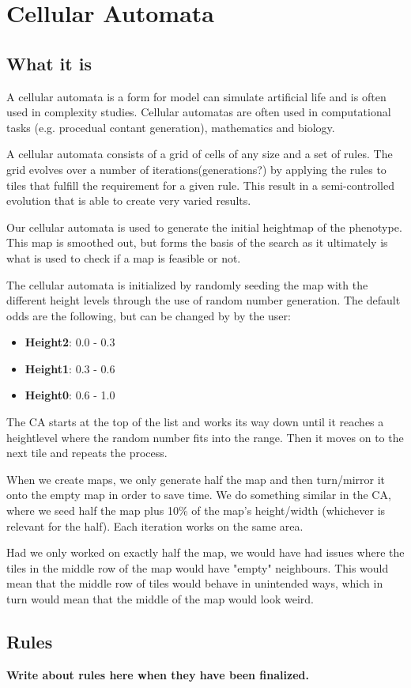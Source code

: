 \section{Cellular Automata}
\label{CellularAutomata}

\subsection{What it is}


A cellular automata is a form for model can simulate artificial life and is often used in complexity studies. Cellular automatas are often used in computational tasks (e.g. procedual contant generation), mathematics and biology.

A cellular automata consists of a grid of cells of any size and a set of rules. The grid evolves over a number of iterations(generations?) by applying the rules to tiles that fulfill the requirement for a given rule. This result in a semi-controlled evolution that is able to create very varied results.

Our cellular automata is used to generate the initial heightmap of the phenotype. This map is smoothed out, but forms the basis of the search as it ultimately is what is used to check if a map is feasible or not.

The cellular automata is initialized by randomly seeding the map with the different height levels through the use of random number generation. The default odds are the following, but can be changed by by the user:
\begin{itemize}

	\item \textbf{Height2}: 0.0 - 0.3

	\item \textbf{Height1}: 0.3 - 0.6

	\item \textbf{Height0}: 0.6 - 1.0

\end{itemize}

The CA starts at the top of the list and works its way down until it reaches a heightlevel where the random number fits into the range. Then it moves on to the next tile and repeats the process.

When we create maps, we only generate half the map and then turn/mirror it onto the empty map in order to save time. We do something similar in the CA, where we seed half the map plus 10\% of the map's height/width (whichever is relevant for the half). Each iteration works on the same area.

Had we only worked on exactly half the map, we would have had issues where the tiles in the middle row of the map would have "empty" neighbours. This would mean that the middle row of tiles would behave in unintended ways, which in turn would mean that the middle of the map would look weird.

\subsection{Rules}

\textbf{Write about rules here when they have been finalized.}